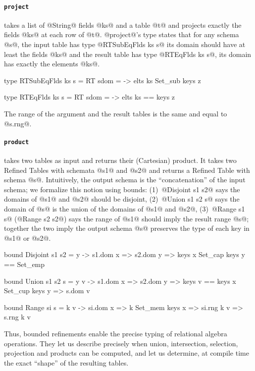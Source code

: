\paragraph{\texttt{project}} takes
a list of @String@ fields @ks@ 
and a table @t@ and projects 
exactly the fields @ks@ at 
each row of @t@.
%
@project@'s type states that for 
any schema @s@, the input table 
has type @RTSubEqFlds ks s@ 
\ie its domain should have at 
least the fields @ks@ and the 
result table has type @RTEqFlds ks s@, 
\ie its domain has exactly the elements @ks@. 
%
\begin{code}
  type RTSubEqFlds ks s
    = RT s{dom = \z -> elts ks Set_sub  keys z}

  type RTEqFlds ks s
    = RT s{dom = \z -> elts ks == keys z}
\end{code}
% 
The range of the argument and the result tables 
is the same and equal to @s.rng@.

\paragraph{\texttt{product}} takes two tables 
as input and returns their (Cartesian) 
product.
%
It takes two Refined Tables with schemata 
@s1@ and @s2@ and returns a Refined Table 
with schema @s@. Intuitively, the output
schema is the ``concatenation'' of the input
schema; we formalize this notion using bounds:
%
(1)~@Disjoint s1 s2@ says the domains of 
    @s1@ and @s2@ should be disjoint,
%
(2)~@Union s1 s2 s@ says the domain of @s@ 
    is the union of the domains of @s1@ and @s2@, 
%
(3)~@Range s1 s@ (\resp @Range s2 s2@) says 
    the range of @s1@ should imply the result 
    range @s@; together the two imply the output
    schema @s@ preserves the type of each key in 
    @s1@ or @s2@.
%
\begin{code}
  bound Disjoint s1 s2 = \x y -> 
    s1.dom x => s2.dom y => keys x Set_cap keys y == Set_emp
   
  bound Union s1 s2 s = \x y v -> 
    s1.dom x => s2.dom y 
             => keys v == keys x Set_cup keys y 
             => s.dom v

  bound Range si s = \x k v -> 
    si.dom x => k Set_mem keys x => si.rng k v 
             => s.rng k v 
\end{code}


Thus, bounded refinements  enable the precise 
typing of  relational algebra operations.
They let us describe precisely when union, 
intersection, selection, projection and products 
can be computed, and let us determine, at compile
time the exact ``shape'' of the resulting tables.

